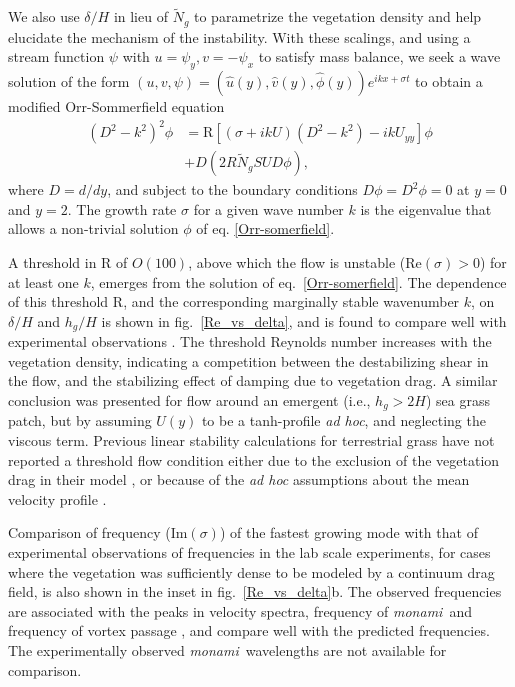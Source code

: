 \documentclass[aps,prl,twocolumn,superscriptaddress,10pt]{revtex4-1}  %
\newcommand{\hg}{h_g}
\newcommand{\Rey}{\text{R}}
\newcommand{\Ndg}{\tilde{N}_g}
\newcommand{\monami}{\textit{monami}}
\begin{document}
We also use $\delta/H$ in lieu of $\Ndg$ to parametrize the vegetation density and help elucidate the mechanism of the instability. 
With these scalings, and using a stream function $\psi$ with $u = \psi_{y}, v= -\psi_x$ to satisfy mass balance, we seek a wave solution of 
the form $\left(u,v,\psi \right)= \left(\hat u(y), \hat v(y), \hat\phi(y) \right)e^{ikx+\sigma t}$ to  obtain a modified Orr-Sommerfield equation 
\begin{equation}
\begin{split}
\left(D^2 -k^{2} \right)^2\phi &= \Rey \left[ \left({\sigma}+ikU\right) \left(D^2-k^2\right) -ikU_{yy}\right]\phi \\
&+D\left(2R \Ndg S U D \phi\right),
\label{Orr-somerfield}
\end{split}
\end{equation}
where $D=d/dy$, and subject to the boundary conditions $D\phi = D^2\phi = 0$ at $y=0$ and $y=2$. 
The growth rate $\sigma$ for a given wave number $k$ is the eigenvalue that allows a non-trivial solution $\phi$ of eq. \eqref{Orr-somerfield}.

A threshold in $\Rey$ of $O(100)$, above which the flow is unstable (Re$(\sigma)>0$) for at least one $k$, emerges from the 
solution of eq.~\eqref{Orr-somerfield}. The dependence of this threshold $\Rey$, and the corresponding marginally stable wavenumber $k$, on $\delta/H$ and $\hg/H$ is shown 
in fig.~\ref{Re_vs_delta}, and is found to compare well with experimental observations \cite{Ghisal02}.
The threshold Reynolds number increases with the vegetation density, indicating a competition between the 
destabilizing shear in the flow, and the stabilizing effect of damping due to vegetation drag.
A similar conclusion was presented \cite{White07} for flow around an emergent (i.e., $\hg>2H$) sea grass patch, but by assuming $U(y)$ to be a tanh-profile \textit{ad hoc}, and neglecting the viscous term.
Previous linear stability calculations for terrestrial grass have not reported a threshold flow condition 
either due to the exclusion of the vegetation drag in their model \cite{Raupach96}, or because of the \textit{ad hoc}
assumptions about the mean velocity profile \cite{Raupach96,Delangre06}. 

Comparison of frequency (Im$(\sigma)$) of the fastest growing mode with that of experimental observations of frequencies in
the lab scale experiments, for cases where the vegetation was sufficiently dense to be modeled by a continuum drag field, is also shown in the inset in fig.~\ref{Re_vs_delta}b. 
The observed frequencies are associated with the peaks in velocity spectra, frequency of \monami ~and frequency of 
vortex passage \cite{Ghisal02}, and compare well with the predicted frequencies. The experimentally observed \monami ~wavelengths are not available for comparison.
\end{document}
